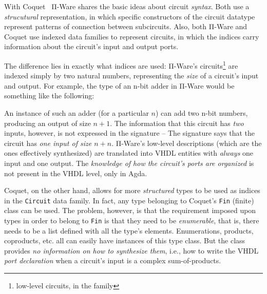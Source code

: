 
        With Coquet~\cite{coquet2011} Π-Ware shares the basic ideas about circuit \emph{syntax}.
        Both use a \emph{strucutural} representation, in which specific constructors of the circuit
        datatype represent patterns of connection between subcircuits.
        Also, both Π-Ware and Coquet use indexed data families to represent circuits, in which
        the indices carry information about the circuit's input and output ports.

        The difference lies in exactly what indices are used: Π-Ware's
        circuits\footnote{low-level circuits, in the  family}
        are indexed simply by two natural numbers, representing the \emph{size} of a circuit's input and output.
        For example, the type of an n-bit adder in Π-Ware would be something like the following:

        \begin{center}
             \AY{:}  \AY{(} \AF{+} \AY{)} \AY{(} \AY{)}
        \end{center}

        An instance of such an adder (for a particular $n$) can add two n-bit numbers, producing
        an output of size $n+1$. The information that this circuit has \emph{two} inputs, however,
        is not expressed in the signature – The signature says that the circuit has
        \emph{one input of size $n+n$}.
        Π-Ware's low-level descriptions (which are the ones effectively synthesized) are translated
        into \ac{VHDL} entities with \emph{always} one input and one output.
        The \emph{knowledge of how the circuit's ports are organized} is not present in the \ac{VHDL}
        level, only in Agda.

        Coquet, on the other hand, allows for more \emph{structured} types to be used as indices in
        the \texttt{Circuit} data family.
        In fact, any type belonging to Coquet's \texttt{Fin} (finite) class can be used.
        The problem, however, is that the requirement imposed upon types in order to belong to
        \texttt{Fin} is that they need to be \emph{enumerable}, that is, there needs to be a
        list defined with all the type's elements.
        Enumerations, products, coproducts, etc. all can easily have instances of this type class.
        But the class provides \emph{no information on how to synthesize them}, i.e.,
        how to write the \ac{VHDL} \emph{port declaration} when a circuit's input is a complex
        sum-of-products.

